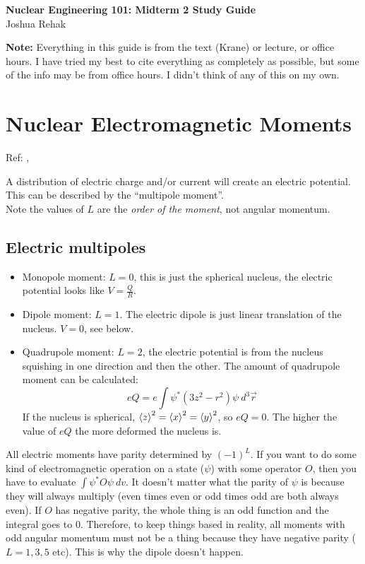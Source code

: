 \documentclass[letter]{article}
\begin{document}
\textbf{\Large{Nuclear Engineering 101: Midterm 2 Study Guide}} \\
Joshua Rehak
\vspace{12pt}

\textbf{Note:} Everything in this guide is from the text (Krane) or
lecture, or office hours. I have tried my best to cite everything as
completely as possible, but some of the info may be from office
hours. I didn't think of any of this on my own.

\section{Nuclear Electromagnetic Moments}

Ref: \cite[pp. 71-75]{krane},\cite[Lec 10]{lecture}

A distribution of electric charge and/or current will create an
electric potential. This can be described by the ``multipole
moment''. \\

Note the values of $L$ are the \textit{order of the moment}, not
angular momentum.

\subsection{Electric multipoles}

\begin{itemize}
\item Monopole moment: $L=0$, this is just the spherical nucleus, the electric
  potential looks like $V = \frac{Q}{R}$. 
\item Dipole moment: $L=1$. The electric dipole is just linear
  translation of the nucleus. $V=0$, see below.
\item Quadrupole moment: $L=2$, the electric potential is from the
  nucleus squishing in one direction and then the other. The amount of
  quadrupole moment can be calculated:
  \begin{equation*}
    eQ=e\int\psi^*(3z^2-r^2)\psi~d^3\vec{r}
  \end{equation*}
  If the nucleus is spherical,
  $\braket{z}^2=\braket{x}^2=\braket{y}^2$, so $eQ=0$. The higher the
  value of $eQ$ the more deformed the nucleus is.
\end{itemize}

All electric moments have parity determined by $(-1)^L$. If you want
to do some kind of electromagnetic operation on a state ($\psi$) with
some operator $O$, then you have to evaluate $\int\psi^*O\psi~dv$. It
doesn't matter what the parity of $\psi$ is because they will always
multiply (even times even or odd times odd are both always even). If
$O$ has negative parity, the whole thing is an odd function and the
integral goes to 0. Therefore, to keep things based in reality, all
 moments with odd angular momentum must not be a thing because they
 have negative parity
($L=1,3,5$ etc). This is why the dipole doesn't happen.
\end{document}
